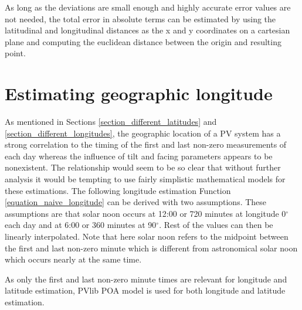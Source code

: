 \vspace{5mm} %

\noindent As long as the deviations are small enough and highly accurate error values are not needed, the total error in absolute terms can be estimated by using the latitudinal and longitudinal distances as the x and y coordinates on a cartesian plane and computing the euclidean distance between the origin and resulting point.


\newpage
\section{Estimating geographic longitude}
\noindent As mentioned in Sections \ref{section_different_latitudes} and \ref{section_different_longitudes}, the geographic location of a PV system has a strong correlation to the timing of the first and last non-zero measurements of each day whereas the influence of tilt and facing parameters appears to be nonexistent. The relationship would seem to be so clear that without further analysis it would be tempting to use fairly simplistic mathematical models for these estimations. The following longitude estimation Function \ref{equation_naive_longitude} can be derived with two assumptions. These assumptions are that solar noon occurs at 12:00 or 720 minutes at longitude 0$^\circ$ each day and at 6:00 or 360 minutes at 90$^\circ$. Rest of the values can then be linearly interpolated. Note that here solar noon refers to the midpoint between the first and last non-zero minute which is different from astronomical solar noon which occurs nearly at the same time.

As only the first and last non-zero minute times are relevant for longitude and latitude estimation, PVlib POA model is used for both longitude and latitude estimation.

\hfill \break






